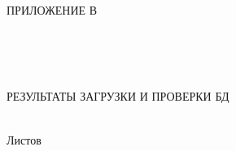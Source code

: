 \begin{ESKDtitlePage}
  \begin{flushright}
    ПРИЛОЖЕНИЕ В \enspace
  \end{flushright}
  
  \begin{center}
    \envDiplomEducation \\
    \envDiplomUniversity \\
    \envDiplomCathedra \\
  \end{center}

  \vfill

  \begin{center}
    РЕЗУЛЬТАТЫ ЗАГРУЗКИ И ПРОВЕРКИ БД
  \end{center}

  \vfill

  \begin{center}
    \envCode \\
    Листов \pageref{LastPage} \\
  \end{center}

  \vfill

  

  \vfill

  \begin{center}
    \ESKDtheYear
  \end{center}
\end{ESKDtitlePage}
